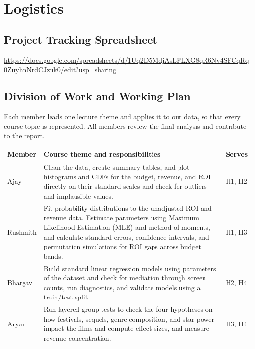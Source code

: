 \documentclass[11pt,a4paper]{article}
\begin{document}
\section{Logistics}

\subsection{Project Tracking Spreadsheet}
\url{https://docs.google.com/spreadsheets/d/1Uq2D5MdjAsLFLXG8qR6Nv4SFCqRq0ZuyhnNrdCJzuk0/edit?usp=sharing}

\subsection{Division of Work and Working Plan}
Each member leads one lecture theme and applies it to our data, so that every course topic is represented. All members review the final analysis and contribute to the report.

\begin{center}\footnotesize
{}
\begin{tabularx}{\linewidth}{@{}p{1.6cm} X p{1.3cm}@{}}
\toprule
\rowcolor{white}\textbf{Member} & \textbf{Course theme and responsibilities} & \textbf{Serves}\\
\midrule
Ajay & Clean the data, create summary tables, and plot histograms and CDFs for the budget, revenue, and ROI directly on their standard scales and check for outliers and implausible values. & H1, H2\\
Rushmith & Fit probability distributions to the unadjusted ROI and revenue data. Estimate parameters using Maximum Likelihood Estimation (MLE) and method of moments, and calculate standard errors, confidence intervals, and permutation simulations for ROI gaps across budget bands. & H1, H3\\
Bhargav & Build standard linear regression models using parameters of the dataset and check for mediation through screen counts, run diagnostics, and validate models using a train/test split. & H2, H4\\
Aryan & Run layered group tests to check the four hypotheses on how festivals, sequels, genre composition, and star power impact the films and compute effect sizes, and measure revenue concentration.   &H3, H4\\
\bottomrule
\end{tabularx}
\end{center}
\vspace{-6pt}
\end{document}
